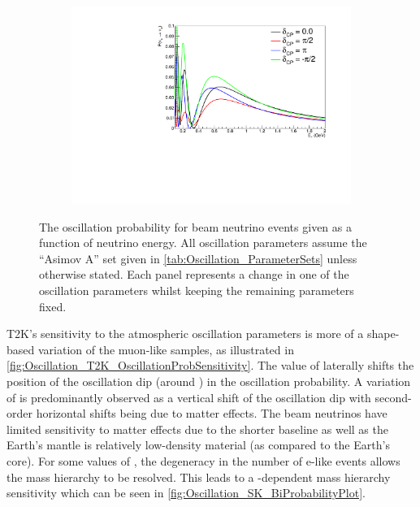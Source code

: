 \begin{figure}[h]
\begin{subfigure}[t]{0.5\textwidth}
    \includegraphics[width=\textwidth, trim={0mm 0mm 0mm 0mm}, clip,page=1]{Figures/Oscillation/T2K_NuMu_x_NuE_DCPSens.pdf}
    \subcaption{\dcp}
  \end{subfigure}
  \caption{The oscillation probability for beam neutrino events given as a function of neutrino energy. All oscillation parameters assume the ``Asimov A'' set given in \autoref{tab:Oscillation_ParameterSets} unless otherwise stated. Each panel represents a change in one of the oscillation parameters whilst keeping the remaining parameters fixed.}
  \label{fig:Oscillation_T2K_OscillationProbSensitivity}
\end{figure}

T2K's sensitivity to the atmospheric oscillation parameters is more of a shape-based variation of the muon-like samples, as illustrated in \autoref{fig:Oscillation_T2K_OscillationProbSensitivity}. The value of  laterally shifts the position of the oscillation dip (around ) in the  oscillation probability. A variation of \sinsqatm is predominantly observed as a vertical shift of the oscillation dip with second-order horizontal shifts being due to matter effects. The beam neutrinos have limited sensitivity to matter effects due to the shorter baseline as well as the Earth's mantle is relatively low-density material (as compared to the Earth's core). For some values of \dcp, the degeneracy in the number of e-like events allows the mass hierarchy to be resolved. This leads to a \dcp-dependent mass hierarchy sensitivity which can be seen in \autoref{fig:Oscillation_SK_BiProbabilityPlot}.

